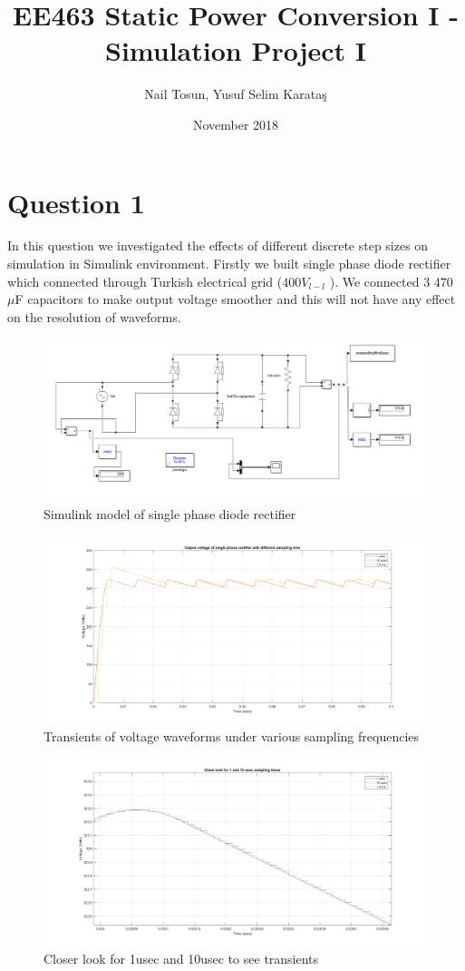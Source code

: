 \documentclass[fleqn, a4paper]{article}
\title{EE463 Static Power Conversion I 
-Simulation Project I}
\author{Nail Tosun, Yusuf Selim Karataş}
\date{November 2018}
\begin{document}
\maketitle

\section*{Question 1}
In this question we investigated the effects of different discrete step sizes on simulation in Simulink environment. Firstly we built single phase diode rectifier which connected through Turkish electrical grid ($400 V_{l-l}$ ). We connected 3 470 $\mu$F capacitors to make output voltage smoother and this will not have any effect on the resolution of waveforms. 
\begin{figure}[H]
  \includegraphics[width=\linewidth]{question-1-simulink-model.PNG}
  \caption{Simulink model of single phase diode rectifier}
  \label{fig:simulink2}
\end{figure}
\begin{figure}[H]
  \includegraphics[width=\linewidth]{Q1_plots_different_samplings.png}
  \caption{Transients of voltage waveforms under various sampling frequencies}
  \label{fig:simulink2}
\end{figure}
\begin{figure}[H]
  \includegraphics[width=\linewidth]{closer-look.png}
  \caption{Closer look for 1usec and 10usec to see transients}
  \label{fig:simulink2}
\end{figure}
\end{document}
